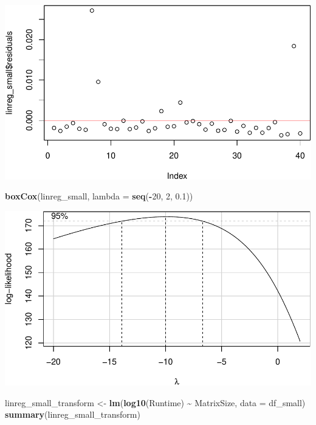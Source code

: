 \documentclass[
]{article}
\newenvironment{Shaded}{\begin{snugshade}}{\end{snugshade}}
\newcommand{\DataTypeTok}[1]{\textcolor[rgb]{0.13,0.29,0.53}{#1}}
\newcommand{\DecValTok}[1]{\textcolor[rgb]{0.00,0.00,0.81}{#1}}
\newcommand{\FloatTok}[1]{\textcolor[rgb]{0.00,0.00,0.81}{#1}}
\newcommand{\KeywordTok}[1]{\textcolor[rgb]{0.13,0.29,0.53}{\textbf{#1}}}
\newcommand{\NormalTok}[1]{#1}
\newcommand{\OperatorTok}[1]{\textcolor[rgb]{0.81,0.36,0.00}{\textbf{#1}}}
\newcommand{\StringTok}[1]{\textcolor[rgb]{0.31,0.60,0.02}{#1}}
\begin{document}
\includegraphics{main_files/figure-latex/unnamed-chunk-18-1.pdf}

\begin{Shaded}
\begin{Highlighting}[]
\KeywordTok{boxCox}\NormalTok{(linreg\_small, }\DataTypeTok{lambda =} \KeywordTok{seq}\NormalTok{(}\OperatorTok{{-}}\DecValTok{20}\NormalTok{, }\DecValTok{2}\NormalTok{, }\FloatTok{0.1}\NormalTok{))}
\end{Highlighting}
\end{Shaded}

\includegraphics{main_files/figure-latex/unnamed-chunk-18-2.pdf}

\begin{Shaded}
\begin{Highlighting}[]
\NormalTok{linreg\_small\_transform \textless{}{-}}\StringTok{ }\KeywordTok{lm}\NormalTok{(}\KeywordTok{log10}\NormalTok{(Runtime) }\OperatorTok{\textasciitilde{}}\StringTok{ }\NormalTok{MatrixSize, }\DataTypeTok{data =}\NormalTok{ df\_small)}
\KeywordTok{summary}\NormalTok{(linreg\_small\_transform)}
\end{Highlighting}
\end{Shaded}
\end{document}
